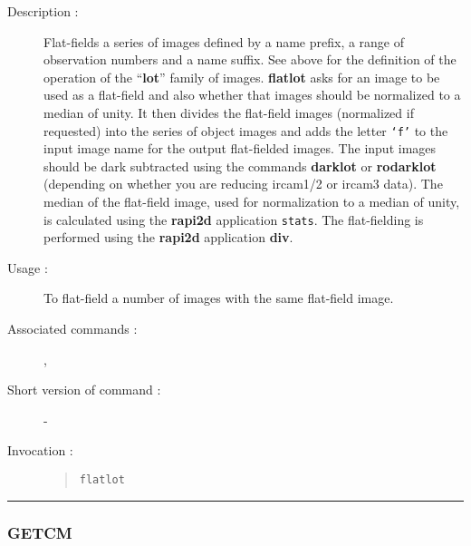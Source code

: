 \begin{description}

\item[Description :] Flat-fields a series of images defined by a name
prefix, a range of observation numbers and a name suffix.  See above
for the definition of the operation of the ``{\bf lot}'' family of
images.  {\bf flatlot} asks for an image to be used as a flat-field and also
whether that images should be normalized to a median of unity.  It then
divides the flat-field images (normalized if requested) into the series
of object images and adds the letter {\tt `f'} to the input image name for
the output flat-fielded images.  The input images should be dark
subtracted using the commands {\bf darklot} or {\bf rodarklot} (depending on
whether you are reducing {\sc ircam1/2} or {\sc ircam3} data).  The
median of the flat-field image, used for normalization to a median of
unity, is calculated using the {\bf rapi2d} application {\tt stats}.  The
flat-fielding is performed using the {\bf rapi2d} application {\bf div}.

\item[Usage :] To flat-field a number of images with the same
flat-field image.
\item[Associated commands :] {\tt {}}, 
{\tt {}}
\item[Short version of command :] -
\item[Invocation :]

\begin{quote}{\tt  flatlot }\end{quote}

\end{description}

\hrule 
\subsubsection*{\label{GETCM}GETCM}

